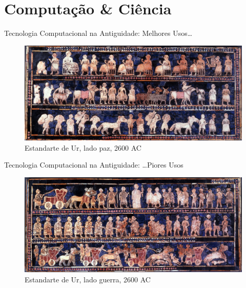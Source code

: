 \documentclass[10pt, compress, aspectratio=169, xcolor={table,usenames,dvipsnames}]{beamer}
\begin{document}
\section{Computação \& Ciência}
\label{sec:orga5a871c}
\begin{frame}[label={sec:orgaf6ce67}]{Tecnologia Computacional na Antiguidade: Melhores Usos\dots{}}
\begin{figure}[htbp]
\centering
\includegraphics[width=\textwidth]{../../../img/ur_estandarte_paz.jpg}
\caption{Estandarte de Ur, \alert{lado paz}, 2600 AC}
\end{figure}
\end{frame}
\begin{frame}[label={sec:org39b04a1}]{Tecnologia Computacional na Antiguidade: \dots{}Piores Usos}
\begin{figure}[htbp]
\centering
\includegraphics[width=\textwidth]{../../../img/ur_estandarte_guerra.jpg}
\caption{Estandarte de Ur, \alert{lado guerra}, 2600 AC}
\end{figure}
\end{frame}
\end{document}
